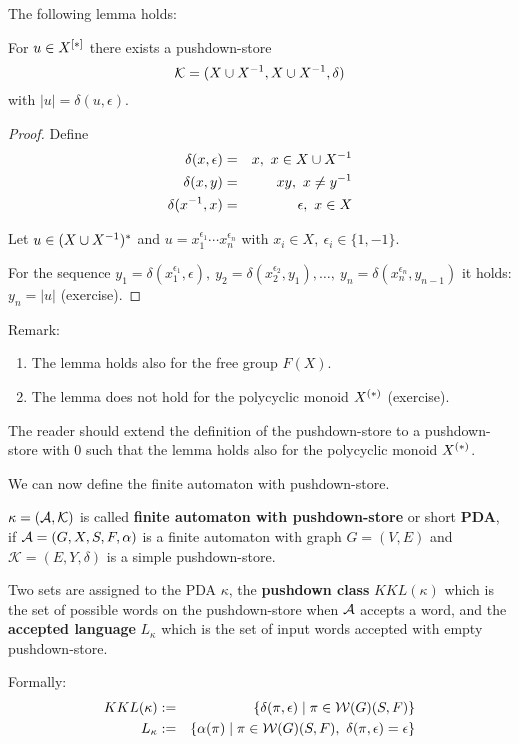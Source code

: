 The following lemma holds:
\begin{lemma}
For $u \in \mbox{${X}^{[*]}$}$ there exists a pushdown-store
\[ \mathcal{K} =(X \cup {X}^{-1}, X \cup {X}^{-1}, \delta) \]
with $|u| = \delta(u, \epsilon)$.
\end{lemma}

\begin{proof}
Define
\begin{eqnarray*}
\delta(x, \epsilon) & = & x,\ x\in X \cup {X}^{-1}\\
\delta(x, y) & = & x y,\ x\neq y^{-1}\\
\delta(x^{-1}, x) & = & \epsilon,\ x\in X
\end{eqnarray*}

Let $u\in (X \cup {X}^{-1})^*$ and $u = x_1^{\epsilon_1} \cdots x_n^{\epsilon_n}$
with $x_i\in X,\ \epsilon_i\in \{1, -1\}$.

For the sequence $y_1 = \delta(x_1^{\epsilon_1}, \epsilon),\ y_2 =
\delta(x_2^{\epsilon_2}, y_1), \ldots,\ y_n = \delta(x_n^{\epsilon_n}, y_{n-1})$
it holds: $y_n = |u|$ (exercise).
\end{proof}

Remark:
\begin{enumerate}
  \item The lemma holds also for the free group $F(X)$.
  \item The lemma does not hold for the polycyclic monoid $\mbox{${X}^{(*)}$}$
  (exercise).
\end{enumerate}

The reader should extend the definition of the pushdown-store to a
pushdown-store with 0 such that the lemma holds also for the polycyclic monoid
$\mbox{${X}^{(*)}$}$.

We can now define the finite automaton with pushdown-store.

\begin{definition}
$\kappa = (\mbox{$\mathcal{A}$}, \mathcal{K})$ is called {\bf finite automaton with
pushdown-store} or short {\bf PDA}, if $\mbox{$\mathcal{A}$} = (G, X, S, F, \alpha)$ is a
finite automaton with graph $G = (V, E)$ and $\mathcal{K} = (E, Y,\delta)$ is a
simple pushdown-store.
\end{definition}

Two sets are assigned to the PDA $\kappa$, the {\bf pushdown class}
$KKL(\kappa)$ which is the set of possible words on the pushdown-store when
$\mbox{$\mathcal{A}$}$ accepts a word, and the {\bf accepted language} $L_\kappa$ which is the
set of input words accepted with empty pushdown-store.

Formally:
\begin{eqnarray*}
KKL(\kappa) &:=& \{ \delta(\pi, \epsilon) \mid \pi \in \pathcat{G}(S, F) \} \\
L_\kappa &:=& \{ \alpha(\pi) \mid \pi \in \pathcat{G}(S, F),\ \delta(\pi,
\epsilon) = \epsilon \}
\end{eqnarray*}

